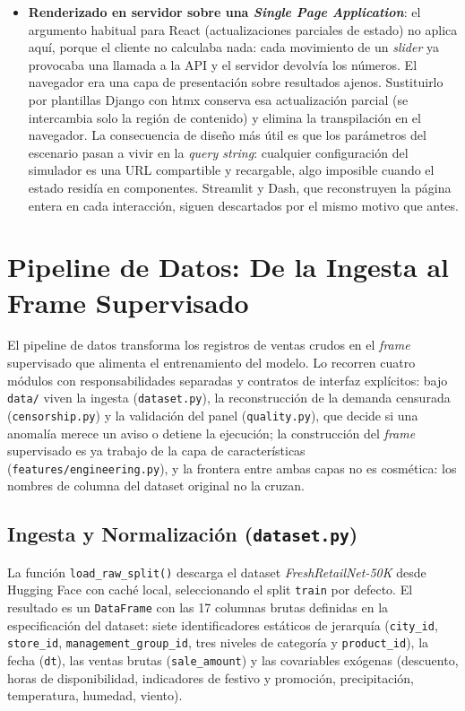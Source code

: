 \begin{itemize}
    \item \textbf{Renderizado en servidor sobre una \textit{Single Page Application}}: el argumento habitual para React (actualizaciones parciales de estado) no aplica aquí, porque el cliente no calculaba nada: cada movimiento de un \textit{slider} ya provocaba una llamada a la API y el servidor devolvía los números. El navegador era una capa de presentación sobre resultados ajenos. Sustituirlo por plantillas Django con htmx conserva esa actualización parcial (se intercambia solo la región de contenido) y elimina la transpilación en el navegador. La consecuencia de diseño más útil es que los parámetros del escenario pasan a vivir en la \textit{query string}: cualquier configuración del simulador es una URL compartible y recargable, algo imposible cuando el estado residía en componentes. Streamlit y Dash, que reconstruyen la página entera en cada interacción, siguen descartados por el mismo motivo que antes.
\end{itemize}

\section{Pipeline de Datos: De la Ingesta al Frame Supervisado}
\label{sec:data_pipeline}

El pipeline de datos transforma los registros de ventas crudos en el \textit{frame} supervisado que alimenta el entrenamiento del modelo. Lo recorren cuatro módulos con responsabilidades separadas y contratos de interfaz explícitos: bajo \texttt{data/} viven la ingesta (\texttt{dataset.py}), la reconstrucción de la demanda censurada (\texttt{censorship.py}) y la validación del panel (\texttt{quality.py}), que decide si una anomalía merece un aviso o detiene la ejecución; la construcción del \textit{frame} supervisado es ya trabajo de la capa de características (\texttt{features/}\allowbreak\texttt{engineering.py}), y la frontera entre ambas capas no es cosmética: los nombres de columna del dataset original no la cruzan.

\subsection{Ingesta y Normalización (\texttt{dataset.py})}

La función \texttt{load\_raw\_split()} descarga el dataset \textit{FreshRetailNet-50K} \cite{freshretailnet2025} desde Hugging Face con caché local, seleccionando el split \texttt{train} por defecto. El resultado es un \texttt{DataFrame} con las 17 columnas brutas definidas en la especificación del dataset: siete identificadores estáticos de jerarquía (\texttt{city\_id}, \texttt{store\_id}, \texttt{management\_group\_id}, tres niveles de categoría y \texttt{product\_id}), la fecha (\texttt{dt}), las ventas brutas (\texttt{sale\_amount}) y las covariables exógenas (descuento, horas de disponibilidad, indicadores de festivo y promoción, precipitación, temperatura, humedad, viento).

